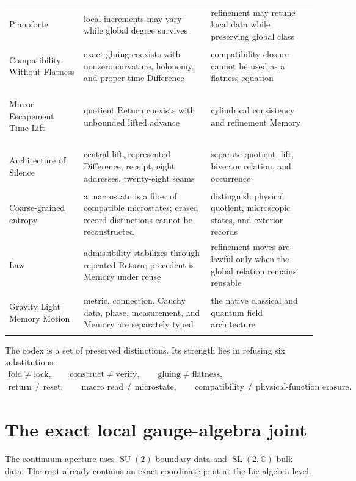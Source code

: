 \documentclass[11pt]{article}
\newcommand{\C}{\mathbb C}
\newcommand{\SU}{\operatorname{SU}}
\newcommand{\SL}{\operatorname{SL}}
\begin{document}
\begin{longtable}{@{}>{\bfseries\raggedright\arraybackslash}p{}>{\raggedright\arraybackslash}p{}>{\raggedright\arraybackslash}p{}@{}}
Pianoforte & local increments may vary while global degree survives & refinement may retune local data while preserving global class\\
Compatibility Without Flatness & exact gluing coexists with nonzero curvature, holonomy, and proper-time Difference & compatibility closure cannot be used as a flatness equation\\
Mirror Escapement Time Lift & quotient Return coexists with unbounded lifted advance & cylindrical consistency and refinement Memory\\
Architecture of Silence & central lift, represented Difference, receipt, eight addresses, twenty-eight seams & separate quotient, lift, bivector relation, and occurrence\\
Coarse-grained entropy & a macrostate is a fiber of compatible microstates; erased record distinctions cannot be reconstructed & distinguish physical quotient, microscopic states, and exterior records \cite{CoppaEntropy2026}\\
Law & admissibility stabilizes through repeated Return; precedent is Memory under reuse & refinement moves are lawful only when the global relation remains reusable \cite{CoppaLaw2026}\\
Gravity Light Memory Motion & metric, connection, Cauchy data, phase, measurement, and Memory are separately typed & the native classical and quantum field architecture\\
\bottomrule
\end{longtable}
\normalsize

The codex is a set of preserved distinctions. Its strength lies in refusing six substitutions:
\[
\boxed{
\begin{gathered}
\text{fold}\neq\text{lock},
\qquad
\text{construct}\neq\text{verify},
\qquad
\text{gluing}\neq\text{flatness},\\
\text{return}\neq\text{reset},
\qquad
\text{macro read}\neq\text{microstate},
\qquad
\text{compatibility}\neq\text{physical-function erasure}.
\end{gathered}}
\]

\section{The exact local gauge-algebra joint}

The continuum aperture uses $\SU(2)$ boundary data and $\SL(2,\C)$ bulk data. The root already contains an exact coordinate joint at the Lie-algebra level.
\end{document}
